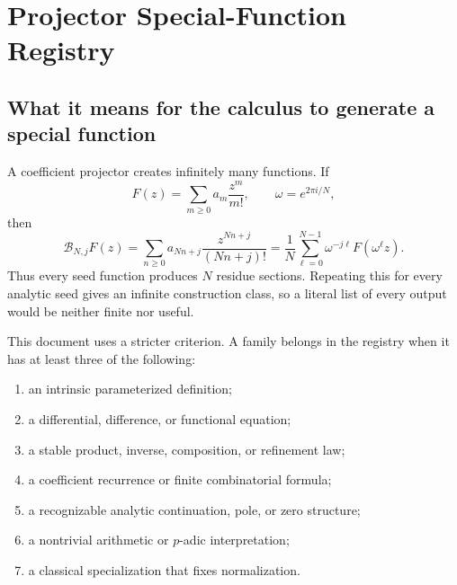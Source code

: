 \providecommand{\BNj}{\mathcal B_{N,j}}
\providecommand{\EE}{\mathsf E}
\providecommand{\Sec}{\mathsf{Sec}}
\providecommand{\Tan}{\mathsf{Tan}}
\providecommand{\CE}{\mathsf{CE}}
\providecommand{\Zb}{\mathfrak Z}
\providecommand{\C}{\mathbb C}
\providecommand{\Q}{\mathbb Q}
\providecommand{\Z}{\mathbb Z}
\providecommand{\sech}{\operatorname{sech}}
\providecommand{\Li}{\operatorname{Li}}

\appendix
\section{Projector Special-Function Registry}
\label{app:projector-special-functions}

\subsection{What it means for the calculus to generate a special function}

A coefficient projector creates infinitely many functions.  If
\[
F(z)=\sum_{m\ge0}a_m\frac{z^m}{m!},
\qquad \omega=e^{2\pi i/N},
\]
then
\[
\BNj F(z)
=\sum_{n\ge0}a_{Nn+j}\frac{z^{Nn+j}}{(Nn+j)!}
=\frac1N\sum_{\ell=0}^{N-1}\omega^{-j\ell}F(\omega^\ell z).
\]
Thus every seed function produces $N$ residue sections.  Repeating this for every analytic seed gives an infinite construction class, so a literal list of every output would be neither finite nor useful.

This document uses a stricter criterion.  A family belongs in the registry when it has at least three of the following:
\begin{enumerate}[label=(\roman*)]
\item an intrinsic parameterized definition;
\item a differential, difference, or functional equation;
\item a stable product, inverse, composition, or refinement law;
\item a coefficient recurrence or finite combinatorial formula;
\item a recognizable analytic continuation, pole, or zero structure;
\item a nontrivial arithmetic or $p$-adic interpretation;
\item a classical specialization that fixes normalization.
\end{enumerate}

